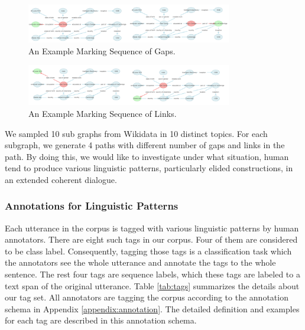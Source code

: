 \documentclass[bsc,frontabs,twoside,singlespacing,parskip,deptreport]{infthesis}     %
\begin{document}
\begin{figure}[h]
    \centering
    \includegraphics[width=0.8\textwidth]{gaps.png}
    \caption{An Example Marking Sequence of Gaps.}
    \label{fig:gaps}
\end{figure}

\begin{figure}[h]
    \centering
    \includegraphics[width=0.8\textwidth]{links.png}
    \caption{An Example Marking Sequence of Links.}
    \label{fig:links}
\end{figure}

We sampled 10 sub graphs from Wikidata in 10 distinct topics. For each subgraph, we generate 4 paths with different number of gaps and links in the path. By doing this, we would like to investigate under what situation, human tend to produce various linguistic patterns, particularly elided constructions, in an extended coherent dialogue.


\subsubsection*{Annotations for Linguistic Patterns}

Each utterance in the corpus is tagged with various linguistic patterns by human annotators. There are eight such tags in our corpus. Four of them are considered to be class label. Consequently, tagging those tags is a classification task which the annotators see the whole utterance and annotate the tags to the whole sentence. The rest four tags are sequence labels, which these tags are labeled to a text span of the original utterance. Table \ref{tab:tags} summarizes the details about our tag set. All annotators are tagging the corpus according to the annotation schema in Appendix \ref{appendix:annotation}. The detailed definition and examples for each tag are described in this annotation schema.
\end{document}

